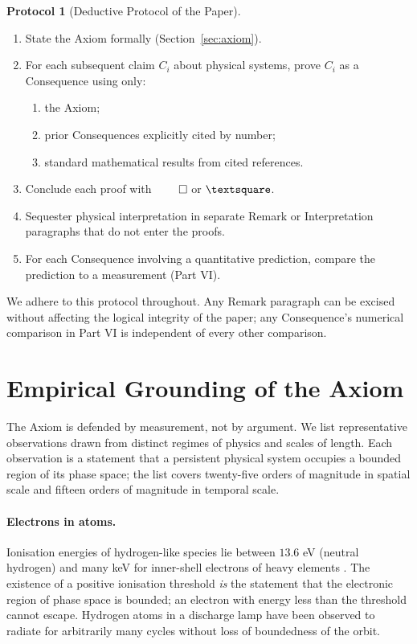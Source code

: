 \documentclass[11pt,twocolumn,a4paper]{article}
\theoremstyle{axiomstyle}
\theoremstyle{conseqstyle}
\theoremstyle{definition}
\newtheorem{protocol}{Protocol}
\theoremstyle{remark}
\begin{document}
\begin{protocol}[Deductive Protocol of the Paper]
\label{proto:main}
\begin{enumerate}
\item State the Axiom formally (Section~\ref{sec:axiom}).
\item For each subsequent claim $C_{i}$ about physical systems, prove $C_{i}$ as a Consequence using only:
  \begin{enumerate}
  \item the Axiom;
  \item prior Consequences explicitly cited by number;
  \item standard mathematical results from cited references.
  \end{enumerate}
\item Conclude each proof with $\qed$ or $\text{\textsquare}$.
\item Sequester physical interpretation in separate Remark or Interpretation paragraphs that do not enter the proofs.
\item For each Consequence involving a quantitative prediction, compare the prediction to a measurement (Part VI).
\end{enumerate}
\end{protocol}

We adhere to this protocol throughout. Any Remark paragraph can be excised without affecting the logical integrity of the paper; any Consequence's numerical comparison in Part VI is independent of every other comparison.

\section{Empirical Grounding of the Axiom}
\label{sec:empiricalground}

The Axiom is defended by measurement, not by argument. We list representative observations drawn from distinct regimes of physics and scales of length. Each observation is a statement that a persistent physical system occupies a bounded region of its phase space; the list covers twenty-five orders of magnitude in spatial scale and fifteen orders of magnitude in temporal scale.

\paragraph{Electrons in atoms.} Ionisation energies of hydrogen-like species lie between $13.6$ eV (neutral hydrogen) and many keV for inner-shell electrons of heavy elements \citep{nistasd,herzberg1944,griffiths2018}. The existence of a positive ionisation threshold \emph{is} the statement that the electronic region of phase space is bounded; an electron with energy less than the threshold cannot escape. Hydrogen atoms in a discharge lamp have been observed to radiate for arbitrarily many cycles without loss of boundedness of the orbit.
\end{document}
